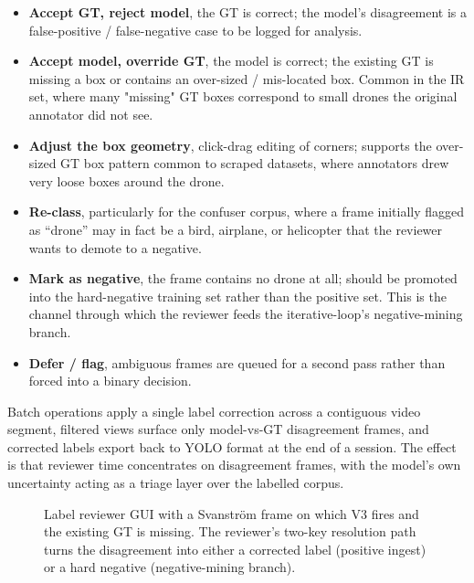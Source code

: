 \documentclass[12pt,a4paper,oneside,openright]{book}
\begin{document}
\begin{itemize}
    \item \textbf{Accept GT, reject model}, the GT is correct; the model's disagreement is a false-positive / false-negative case to be logged for analysis.
    \item \textbf{Accept model, override GT}, the model is correct; the existing GT is missing a box or contains an over-sized / mis-located box. Common in the IR set, where many "missing" GT boxes correspond to small drones the original annotator did not see.
    \item \textbf{Adjust the box geometry}, click-drag editing of corners; supports the over-sized GT box pattern common to scraped datasets, where annotators drew very loose boxes around the drone.
    \item \textbf{Re-class}, particularly for the confuser corpus, where a frame initially flagged as ``drone'' may in fact be a bird, airplane, or helicopter that the reviewer wants to demote to a negative.
    \item \textbf{Mark as negative}, the frame contains no drone at all; should be promoted into the hard-negative training set rather than the positive set. This is the channel through which the reviewer feeds the iterative-loop's negative-mining branch.
    \item \textbf{Defer / flag}, ambiguous frames are queued for a second pass rather than forced into a binary decision.
\end{itemize}

Batch operations apply a single label correction across a contiguous video segment, filtered views surface only model-vs-GT disagreement frames, and corrected labels export back to YOLO format at the end of a session. The effect is that reviewer time concentrates on disagreement frames, with the model's own uncertainty acting as a triage layer over the labelled corpus.

\begin{figure}[htbp]
    \centering
    \caption{Label reviewer GUI with a Svanstr\"om frame on which V3 fires and the existing GT is missing. The reviewer's two-key resolution path turns the disagreement into either a corrected label (positive ingest) or a hard negative (negative-mining branch).}
    \label{fig:label_reviewer}
\end{figure}
\end{document}
